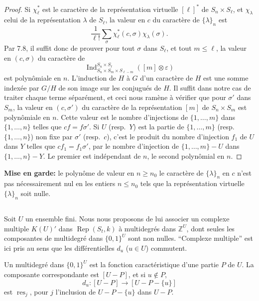 \documentclass[11pt,a4paper]{article}
\theoremstyle{plain}
\theoremstyle{definition}
\DeclareMathOperator{\Ind}{Ind}
\DeclareMathOperator{\Rep}{Rep}
\DeclareMathOperator{\res}{res}
\newcommand{\Z}{\mathbb{Z}}
\newcommand{\eps}{\varepsilon}
\begin{document}
\begin{proof}
Si $\chi_\ell^*$ est le caract\`ere de la repr\'esentation virtuelle $[\ell]^*$ de $S_n \times S_\ell$, et $\chi_\lambda$ celui de la repr\'esentation $\lambda$ de $S_\ell$, la valeur en $c$ du caract\`ere de $\{\lambda\}_n$ est
\[
\frac{1}{\ell!} \sum_\sigma \chi_\ell^*(c, \sigma) \chi_\lambda(\sigma).
\]
Par 7.8, il suffit donc de prouver pour tout $\sigma$ dans $S_\ell$, et tout $m \leq \ell$, la valeur en $(c, \sigma)$ du caract\`ere de
\[
\Ind_{S_n \times S_m \times S_{\ell-m}}^{S_n \times S_\ell}([m] \otimes \eps)
\]
est polyn\^omiale en $n$. L'induction de $H$ \`a $G$ d'un caract\`ere de $H$ est une somme index\'ee par $G/H$ de son image sur les conjugu\'es de $H$. Il suffit dans notre cas de traiter chaque terme s\'epar\'ement, et ceci nous ram\`ene \`a v\'erifier que pour $\sigma'$ dans $S_m$, la valeur en $(c, \sigma')$ du caract\`ere de la repr\'esentation $[m]$ de $S_n \times S_m$ est polyn\^omiale en $n$. Cette valeur est le nombre d'injections de $\{1, \ldots, m\}$ dans $\{1, \ldots, n\}$ telles que $cf = f\sigma'$. Si $U$ (resp.~$Y$) est la partie de $\{1, \ldots, m\}$ (resp.~$\{1, \ldots, n\}$) non fixe par $\sigma'$ (resp.~$c$), c'est le produit du nombre d'injection $f_1$ de $U$ dans $Y$ telles que $cf_1 = f_1\sigma'$, par le nombre d'injection de $\{1, \ldots, m\} - U$ dans $\{1, \ldots, n\} - Y$. Le premier est ind\'ependant de $n$, le second polyn\^omial en $n$.
\end{proof}

\noindent\textbf{Mise en garde:} le polyn\^ome de valeur en $n \geq n_0$ le caract\`ere de $\{\lambda\}_n$ en $c$ n'est pas n\'ecessairement nul en les entiers $n \leq n_0$ tels que la repr\'esentation virtuelle $\{\lambda\}_n$ soit nulle.

\subsection{}
Soit $U$ un ensemble fini. Nous nous proposons de lui associer un complexe multiple $K(U)'$ dans $\Rep(S_t, k)$ \`a multidegr\'es dans $\Z^U$, dont seules les composantes de multidegr\'e dans $\{0,1\}^U$ sont non nulles. ``Complexe multiple'' est ici pris au sens que les diff\'erentielles $d_u$ ($u \in U$) commutent.

Un multidegr\'e dans $\{0,1\}^U$ est la fonction caract\'eristique d'une partie $P$ de $U$. La composante correspondante est $[U - P]$, et si $u \notin P$,
\[
d_u : [U - P] \to [U - P - \{u\}]
\]
est $\res_j$, pour $j$ l'inclusion de $U - P - \{u\}$ dans $U - P$.
\end{document}
